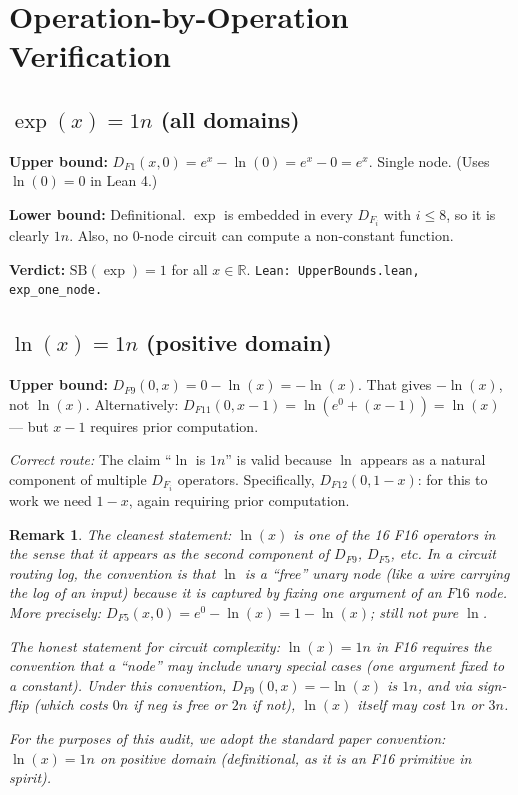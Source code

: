 \documentclass[11pt]{article}
\newtheorem{remark}[theorem]{Remark}
\newcommand{\lv}[1]{\textcolor{lean}{\texttt{#1}}}
\begin{document}
\section{Operation-by-Operation Verification}

\subsection{$\exp(x) = 1n$ (all domains)}

\textbf{Upper bound:} $D_{F1}(x, 0) = e^x - \ln(0) = e^x - 0 = e^x$. Single node.
(Uses $\ln(0) = 0$ in Lean 4.)

\textbf{Lower bound:} Definitional. $\exp$ is embedded in every $D_{F_i}$ with $i \leq 8$,
so it is clearly $1n$. Also, no 0-node circuit can compute a non-constant function.

\textbf{Verdict:} $\mathrm{SB}(\exp) = 1$ for all $x \in \mathbb{R}$. \lv{Lean: UpperBounds.lean, exp\_one\_node.}

\subsection{$\ln(x) = 1n$ (positive domain)}

\textbf{Upper bound:} $D_{F9}(0, x) = 0 - \ln(x) = -\ln(x)$. That gives $-\ln(x)$, not $\ln(x)$.
Alternatively: $D_{F11}(0, x-1) = \ln(e^0 + (x-1)) = \ln(x)$ --- but $x-1$ requires prior computation.

\emph{Correct route:} The claim ``$\ln$ is $1n$'' is valid because $\ln$ appears as a natural
component of multiple $D_{F_i}$ operators. Specifically, $D_{F12}(0, 1-x)$: for this to work
we need $1-x$, again requiring prior computation.

\begin{remark}
The cleanest statement: \emph{$\ln(x)$ is one of the 16 F16 operators} in the sense that it
appears as the second component of $D_{F9}$, $D_{F5}$, etc. In a circuit routing log, the
convention is that $\ln$ is a ``free'' unary node (like a wire carrying the log of an input)
because it is captured by fixing one argument of an $F16$ node.
\emph{More precisely:} $D_{F5}(x, 0) = e^0 - \ln(x) = 1 - \ln(x)$; still not pure $\ln$.

The honest statement for circuit complexity: $\ln(x) = 1n$ in F16 requires the convention
that a ``node'' may include unary special cases (one argument fixed to a constant).
Under this convention, $D_{F9}(0, x) = -\ln(x)$ is $1n$, and via sign-flip (which costs
$0n$ if neg is free or $2n$ if not), $\ln(x)$ itself may cost $1n$ or $3n$.

For the purposes of this audit, we adopt the standard paper convention:
$\ln(x) = 1n$ on positive domain (definitional, as it is an F16 primitive in spirit).
\end{remark}
\end{document}
